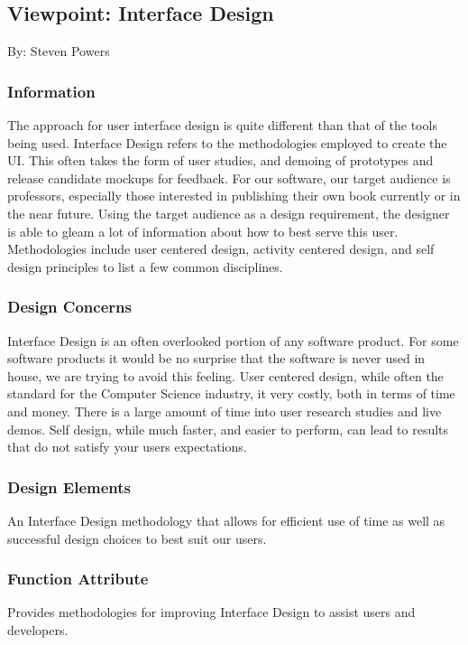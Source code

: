 \documentclass[onecolumn, draftclsnofoot,10pt, compsoc]{IEEEtran}
\begin{document}
\subsection{Viewpoint: Interface Design}
\noindent By: Steven Powers \\

\subsubsection{Information}
\noindent The approach for user interface design is quite different
than that of the tools being used. Interface Design refers to the
methodologies employed to create the UI. This often takes the form of
user studies, and demoing of prototypes and release candidate mockups
for feedback. For our software, our target audience is professors,
especially those interested in publishing their own book currently or
in the near future. Using the target audience as a design requirement,
the designer is able to gleam a lot of information about how to best
serve this user. Methodologies include user centered design, activity 
centered design, and self design principles to list a few common 
disciplines. \\

\subsubsection{Design Concerns}
\noindent Interface Design is an often overlooked portion of any software 
product. For some software products it would be no surprise that the software 
is never used in house, we are trying to avoid this feeling.
User centered design, while often the standard for the Computer Science 
industry, it very costly, both in terms of time and money. There is a large 
amount of time into user research studies and live demos. Self design, while 
much faster, and easier to perform, can lead to results that do not satisfy 
your users expectations.\\

\subsubsection{Design Elements}
\noindent An Interface Design methodology that allows for efficient
use of time as well as successful design choices to best suit our users. \\

\subsubsection{Function Attribute}
\noindent Provides methodologies for improving Interface Design to assist
users and developers. \\
\end{document}
